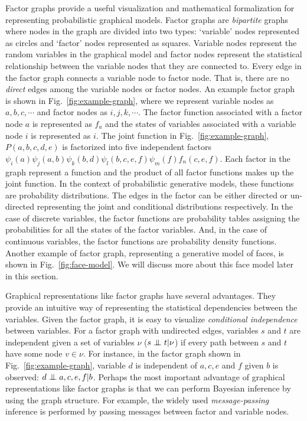 Factor graphs provide a useful visualization and mathematical formalization for representing probabilistic
graphical models. Factor graphs are \emph{bipartite} graphs where nodes in the graph
are divided into two types: `variable' nodes represented as circles and `factor' nodes
represented as squares. Variable nodes represent the random variables in the graphical model and
factor nodes represent the statistical relationship between the variable nodes that they are connected to.
Every edge in the factor graph connects a variable node to factor node. That is,
there are no \emph{direct} edges among the variable nodes or factor nodes. An example
factor graph is shown in Fig.~\ref{fig:example-graph}, where we represent variable nodes
as $a,b,c,\cdots$ and factor nodes as $i,j,k,\cdots$. The factor function associated with
a factor node $a$ is represented as $f_a$ and the states of variables associated with
a variable node $i$ is represented as $i$.
The joint function in Fig.~\ref{fig:example-graph},
$P(a,b,c,d,e)$ is factorized into five independent factors
$\psi_i(a)\psi_j(a,b)\psi_k(b,d)\psi_l(b,c,e,f)\psi_m(f)f_n(c,e,f)$.
Each factor in the graph represent a function and the product of all factor functions makes
up the joint function. In the context of probabilistic generative models, these
functions are probability distributions. The edges in the factor can be either directed
or un-directed representing the joint and conditional distributions respectively.
In the case of discrete variables, the factor functions are probability tables
assigning the probabilities for all the states of the factor variables. And, in the
case of continuous variables, the factor functions are probability density functions.
Another example of factor graph, representing a generative model of faces, is
shown in Fig.~\ref{fig:face-model}. We will discuss more about this face model later
in this section.

Graphical representations like factor graphs have several advantages. They provide
an intuitive way of representing the statistical dependencies between the variables.
Given the factor graph, it is easy to visualize \emph{conditional independence}
between variables.
For a factor graph with undirected edges, variables $s$ and $t$ are independent
given a set of variables $\nu$ ($s \ci t | \nu$)
if every path between $s$ and $t$ have some node $v\in\nu$.
For instance, in the factor graph shown in Fig.~\ref{fig:example-graph},
variable $d$ is independent of $a,c,e$ and $f$ given $b$ is observed: $d \ci a,c,e,f | b$.
Perhaps the most important advantage of graphical representations like factor graphs
is that we can perform Bayesian inference by using the graph structure. For example, the widely used
\emph{message-passing} inference is performed by passing messages between factor and variable nodes.

